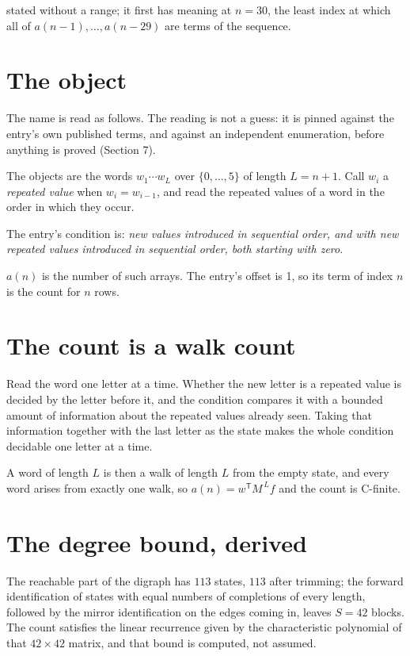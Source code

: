 \documentclass[11pt]{article}
\theoremstyle{definition}
\begin{document}
stated without a range; it first has meaning at $n = 30$, the least index at which all of $a(n-1),\dots,a(n-29)$ are terms of the sequence.

\section{The object}

The name is read as follows. The reading is not a guess: it is pinned against the entry's own published terms, and against an independent enumeration, before anything is proved (Section 7).

The objects are the words $w_1\cdots w_L$ over $\{0,\dots,5\}$ of length $L = n + 1$. Call $w_i$ a {\itshape repeated value} when $w_i = w_{i-1}$, and read the repeated values of a word in the order in which they occur.

The entry's condition is: {\itshape new values introduced in sequential order, and with new repeated values introduced in sequential order, both starting with zero}.

$a(n)$ is the number of such arrays. The entry's offset is 1, so its term of index $n$ is the count for $n$ rows.

\section{The count is a walk count}

Read the word one letter at a time. Whether the new letter is a repeated value is decided by the letter before it, and the condition compares it with a bounded amount of information about the repeated values already seen. Taking that information together with the last letter as the state makes the whole condition decidable one letter at a time.

A word of length $L$ is then a walk of length $L$ from the empty state, and every word arises from exactly one walk, so $a(n) = w^{\mathsf T}M^{\,L}f$ and the count is C-finite.

\section{The degree bound, derived}

The reachable part of the digraph has $113$ states, $113$ after trimming; the forward identification of states with equal numbers of completions of every length, followed by the mirror identification on the edges coming in, leaves $S = 42$ blocks. The count satisfies the linear recurrence given by the characteristic polynomial of that $42\times42$ matrix, and that bound is computed, not assumed.
\end{document}
